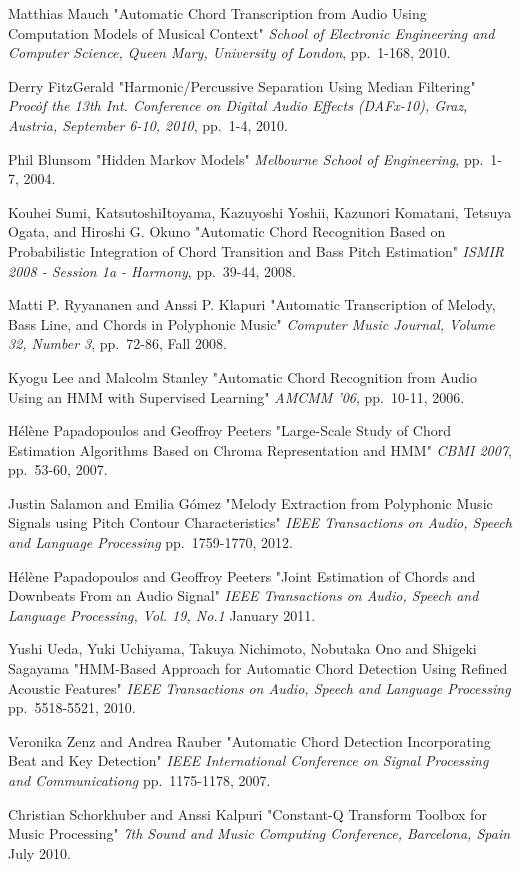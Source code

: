 \documentclass{article}
\begin{document}
\begin{thebibliography}{citations}
Matthias Mauch
"Automatic Chord Transcription from Audio Using Computation Models of Musical Context"
{\it School of Electronic Engineering and Computer Science, Queen Mary, University of London},
pp.~1-168, 2010.

Derry FitzGerald
"Harmonic/Percussive Separation Using Median Filtering"
{\it Proc\. of the 13th Int. Conference on Digital Audio Effects (DAFx-10), Graz, Austria, September 6-10, 2010},
pp.~1-4, 2010.

Phil Blunsom
"Hidden Markov Models"
{\it Melbourne School of Engineering},
pp.~1-7, 2004.

Kouhei Sumi, KatsutoshiItoyama, Kazuyoshi Yoshii, Kazunori Komatani, Tetsuya Ogata, and Hiroshi G. Okuno
"Automatic Chord Recognition Based on Probabilistic Integration of Chord Transition and Bass Pitch Estimation"
{\it ISMIR 2008 - Session 1a - Harmony},
pp.~39-44, 2008.

Matti P. Ryyananen and Anssi P. Klapuri
"Automatic Transcription of Melody, Bass Line, and Chords in Polyphonic Music"
{\it Computer Music Journal, Volume 32, Number 3},
pp.~72-86, Fall 2008.

Kyogu Lee and Malcolm Stanley
"Automatic Chord Recognition from Audio Using an HMM with Supervised Learning"
{\it AMCMM '06},
pp.~10-11, 2006.

Hélène Papadopoulos and Geoffroy Peeters
"Large-Scale Study of Chord Estimation Algorithms Based on Chroma Representation and HMM"
{\it CBMI 2007},
pp.~53-60, 2007.

Justin Salamon and Emilia G{\'o}mez
"Melody Extraction from Polyphonic Music Signals using Pitch Contour Characteristics"
{\it IEEE Transactions on Audio, Speech and Language Processing}
pp.~1759-1770, 2012.

Hélène Papadopoulos and Geoffroy Peeters
"Joint Estimation of Chords and Downbeats From an Audio Signal"
{\it IEEE Transactions on Audio, Speech and Language Processing, Vol. 19, No.1}
January 2011.

Yushi Ueda, Yuki Uchiyama, Takuya Nichimoto, Nobutaka Ono and Shigeki Sagayama
"HMM-Based Approach for Automatic Chord Detection Using Refined Acoustic Features"
{\it IEEE Transactions on Audio, Speech and Language Processing}
pp.~5518-5521, 2010.

Veronika Zenz and Andrea Rauber
"Automatic Chord Detection Incorporating Beat and Key Detection"
{\it IEEE International Conference on Signal Processing and Communicationg}
pp.~1175-1178, 2007.

Christian Schorkhuber and Anssi Kalpuri
"Constant-Q Transform Toolbox for Music Processing" {\it 7th Sound and Music
Computing Conference, Barcelona, Spain} July 2010.


\end{thebibliography}


\end{document}
